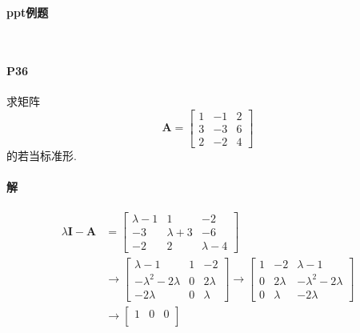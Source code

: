 \documentclass[12pt, a4paper, oneside, fontset=none]{ctexart}
\begin{document}
\centerline{\large{\textbf{ppt例题}}} \ \par

\paragraph*{P36} 求矩阵
\[
    \bm{A} = \begin{bmatrix}
        1 & -1 & 2 \\
        3 & -3 & 6 \\
        2 & -2 & 4
    \end{bmatrix}
\]
的若当标准形.

\paragraph*{解}
\begin{align*}
    \lambda\bm{I} - \bm{A} & = \begin{bmatrix}
                                   \lambda - 1 & 1           & -2          \\
                                   -3          & \lambda + 3 & - 6         \\
                                   -2          & 2           & \lambda - 4
                               \end{bmatrix}                  \\
                           & \to \begin{bmatrix}
                                     \lambda - 1           & 1 & -2        \\
                                     -\lambda^2 - 2\lambda & 0 & 2 \lambda \\
                                     -2\lambda             & 0 & \lambda
                                 \end{bmatrix} \to \begin{bmatrix}
                                                       1 & -2       & \lambda - 1           \\
                                                       0 & 2\lambda & -\lambda^2 - 2\lambda \\
                                                       0 & \lambda  & -2\lambda
                                                   \end{bmatrix} \\
                           & \to \begin{bmatrix}
                                     1 & 0        & 0                     \\

\end{bmatrix}
\end{align*}
\end{document}
